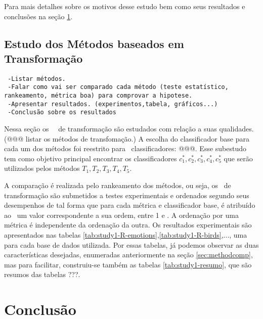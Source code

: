   Para mais detalhes sobre os motivos desse estudo bem como seus resultados e conclusões na seção \ref{sec:study1}.
  

\section{Estudo dos Métodos baseados em Transformação}
\label{sec:study1}
\begin{verbatim}
 -Listar métodos.
 -Falar como vai ser comparado cada método (teste estatístico, rankeamento, métrica boa) para comprovar a hipotese.
 -Apresentar resultados. (experimentos,tabela, gráficos...)
 -Conclusão sobre os resultados
\end{verbatim}

Nessa seção os \NmlT~\MMLs~de transformação são estudados com relação a suas qualidades. (@@@ listar os métodos de transfomação.)
A escolha do classificador base para cada um dos métodos foi reestrito para \Ncb~classificadores: @@@.
Esse subestudo tem como objetivo principal encontrar os classificadores $c_1^*,c_2^*,c_3^*,c_4^*,c_5^*$ que serão utilizados pelos
métodos $T_1,T_2,T_3,T_4,T_5$.

A comparação é realizada pelo rankeamento dos métodos, ou seja, os \MMLs~de transformação são submetidos a testes experimentais
e ordenados segundo seus desempenhos de tal forma que para cada métrica e classificador base,
é atribuído ao \MML~um valor correspondente a sua ordem, entre 1 e \NmlT. A ordenação por uma métrica
é independente da ordenação da outra. 
Os resultados experimentais são apresentados nas tabelas \ref{tab:study1-R-emotions},\ref{tab:study1-R-birds},..., uma para cada base de dados utilizada.
Por essas tabelas, já podemos observar as duas características desejadas, enumeradas anteriormente na seção \ref{sec:methodcomp},
mas para facilitar, construiu-se também as tabelas \ref{tab:study1-resumo}, que são resumos das tabelas ???.






\chapter{Conclusão}